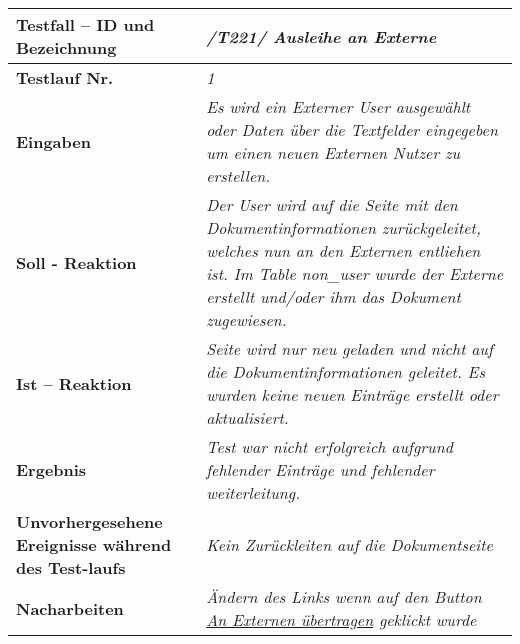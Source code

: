 \begin{longtable}{|p{5cm}|p{10cm}|}
\hline
\textbf{Testfall -- ID und Bezeichnung} & \textit{/T221/ Ausleihe an Externe} \\
\hline
\textbf{Testlauf Nr.} & \textit{1} \\
\hline
\textbf{Eingaben} & \textit{
Es wird ein Externer User ausgewählt oder Daten über die Textfelder eingegeben
um einen neuen Externen Nutzer zu erstellen.
} \\
\hline
\textbf{Soll - Reaktion} & \textit{
Der User wird auf die Seite mit den Dokumentinformationen zurückgeleitet,
welches nun an den Externen entliehen ist.
Im Table non\_user wurde der Externe erstellt und/oder ihm das Dokument
zugewiesen.
} \\
\hline
\textbf{Ist -- Reaktion} & \textit{
Seite wird nur neu geladen und nicht auf die Dokumentinformationen geleitet.
Es wurden keine neuen Einträge erstellt oder aktualisiert.
} \\
\hline
\textbf{Ergebnis} & \textit{
Test war nicht erfolgreich aufgrund fehlender Einträge und fehlender
weiterleitung.
} \\
\hline
\textbf{Unvorhergesehene Ereignisse w\"ahrend des Test-laufs } &
\textit{Kein Zurückleiten auf die Dokumentseite} \\
\hline
\textbf{Nacharbeiten } & \textit{Ändern des Links wenn auf den Button \uline{An
Externen übertragen} geklickt wurde} \\
\hline
 \end{longtable}

